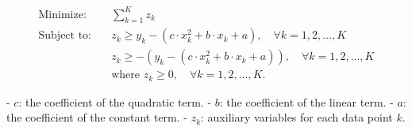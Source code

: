 \documentclass{article}
\begin{document}
\begin{align*}
\text{Minimize:} \quad & \sum_{k=1}^{K} z_k \\
\text{Subject to:} \quad & z_k \geq y_k - (c \cdot x_k^2 + b \cdot x_k + a), \quad \forall k = 1, 2, \ldots, K \\
& z_k \geq -(y_k - (c \cdot x_k^2 + b \cdot x_k + a)), \quad \forall k = 1, 2, \ldots, K \\
& \text{where } z_k \geq 0, \quad \forall k = 1, 2, \ldots, K.
\end{align*}

- $c$: the coefficient of the quadratic term.
- $b$: the coefficient of the linear term.
- $a$: the coefficient of the constant term.
- $z_k$: auxiliary variables for each data point $k$.
\end{document}
